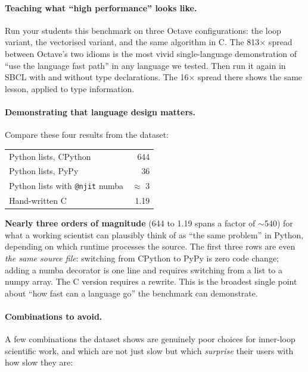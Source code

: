 \documentclass[11pt,a4paper]{article}
\begin{document}
\paragraph{Teaching what ``high performance'' looks like.}
Run your students this benchmark on three Octave configurations: the
loop variant, the vectorised variant, and the same algorithm in C.
The 813$\times$ spread between Octave's two idioms is the most vivid
single-language demonstration of ``use the language fast path'' in
any language we tested. Then run it again in SBCL with and without
type declarations. The 16$\times$ spread there shows the same lesson,
applied to type information.

\paragraph{Demonstrating that language design matters.}
Compare these four results from the dataset:

\begin{center}\small
\begin{tabular}{lr}
\toprule
Python lists, CPython     & 644 \\
Python lists, PyPy        & 36 \\
Python lists with \verb|@njit| numba & $\approx$ 3 \\
Hand-written C            & 1.19 \\
\bottomrule
\end{tabular}
\end{center}

\noindent
\textbf{Nearly three orders of magnitude} (644 to 1.19 spans a
factor of $\sim$540) for what a working scientist can plausibly
think of as ``the same problem'' in Python, depending on which
runtime processes the source. The first three rows are even
\emph{the same source file}: switching from CPython to PyPy is
zero code change; adding a numba decorator is one line and
requires switching from a list to a numpy array. The C version
requires a rewrite. This is the broadest single point about ``how
fast can a language go'' the benchmark can demonstrate.

\paragraph{Combinations to avoid.}
A few combinations the dataset shows are genuinely poor choices for
inner-loop scientific work, and which are not just slow but which
\emph{surprise} their users with how slow they are:
\end{document}
